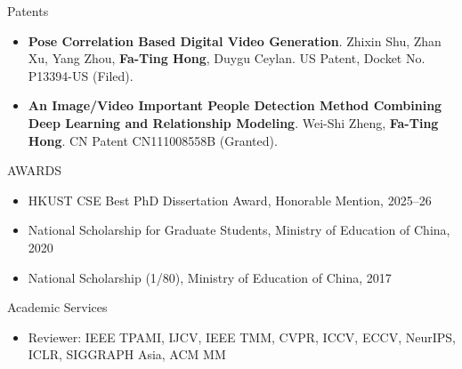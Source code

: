 \documentclass{resume} %
\begin{document}
\begin{rSection}{Patents}

\begin{itemize}[leftmargin=18pt]
\setlength{\itemsep}{-2pt}
    \item \textbf{Pose Correlation Based Digital Video Generation}. Zhixin Shu, Zhan Xu, Yang Zhou, \textbf{\mbox{Fa-Ting} Hong}, Duygu Ceylan. US Patent, Docket No. P13394-US (Filed).
    \item \textbf{An Image/Video Important People Detection Method Combining Deep Learning and Relationship Modeling}. Wei-Shi Zheng, \textbf{Fa-Ting Hong}. CN Patent CN111008558B (Granted).
\end{itemize}

\end{rSection}


\begin{rSection}{AWARDS}

\begin{itemize}[leftmargin=10pt]
\setlength{\itemsep}{-3pt}
    \item HKUST CSE Best PhD Dissertation Award, Honorable Mention, 2025--26
    \item National Scholarship for Graduate Students, Ministry of Education of China, 2020
    \item National Scholarship (1/80), Ministry of Education of China, 2017

\end{itemize}

\end{rSection}

\begin{rSection}{Academic Services}

\begin{itemize}[leftmargin=10pt]
\setlength{\itemsep}{-3pt}
    \item Reviewer: IEEE TPAMI, IJCV, IEEE TMM, CVPR, ICCV, ECCV, NeurIPS, ICLR, SIGGRAPH Asia, ACM MM
\end{itemize}

\end{rSection}
\end{document}
